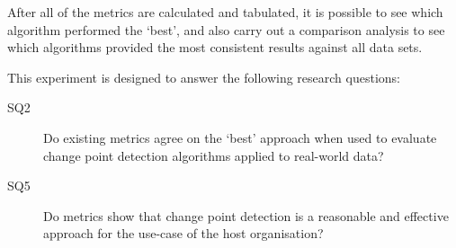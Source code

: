 \documentclass[../main.tex]{subfiles}
\begin{document}
\pagebreak[3]

After all of the metrics are calculated and tabulated, it is possible to see which algorithm performed the `best', and also carry out a comparison analysis to see which algorithms provided the most consistent results against all data sets.

This experiment is designed to answer the following research questions:

\begin{description}
    \item[SQ2] Do existing metrics agree on the `best' approach when used to evaluate change point detection algorithms applied to real-world data?
    \item[SQ5] Do metrics show that change point detection is a reasonable and effective approach for the use-case of the host organisation?
\end{description}
\end{document}
